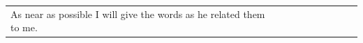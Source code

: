 \begin{tabular}{p{1.7cm}|p{1.7cm}|p{1.7cm}|p{1.7cm}|p{1.7cm}|p{1.7cm}|p{1.7cm}|p{1.7cm}|p{1.7cm}}
{				As near as possible I will give the words as he related them to me.
				
				\phantom{.}} \\
			\end{tabular}
			
\pagebreak{}
	

				
				
				
				
